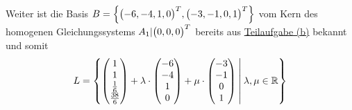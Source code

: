 \documentclass{scrreprt}
\begin{document}
\begin{enumerate}[(a)]
  Weiter ist die Basis
  $B = \qty{\qty\big(-6, -4, 1, 0)^T, \qty\big(-3, -1, 0, 1)^T}$ vom Kern des
  homogenen Gleichungssystems $A_1|\qty\big(0, 0, 0)^T$ bereits aus
  \hyperref[n_6_2_b]{Teilaufgabe (b)} bekannt und somit
  \[
    L = \qty{
      \begin{pmatrix}
        1 \\
        1 \\
        \frac{1}{6} \\
        \frac{38}{6} \\
      \end{pmatrix} + \lambda \cdot \begin{pmatrix}
        -6 \\
        -4 \\
        1  \\
        0  \\
      \end{pmatrix} + \mu \cdot \begin{pmatrix}
        -3 \\
        -1 \\
        0  \\
        1  \\
      \end{pmatrix}
      \:\middle|\:
      \lambda, \mu \in \mathbb{R}
    }
  \]

\end{enumerate}
\end{document}
